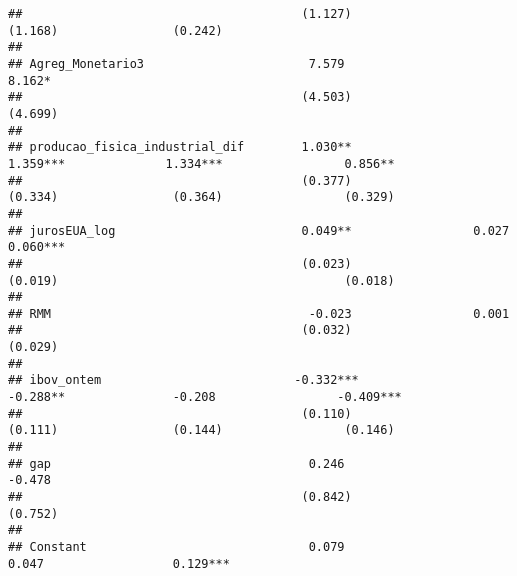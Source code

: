 \documentclass[
]{article}
\begin{document}
\begin{verbatim}
##                                       (1.127)                (1.168)                (0.242)                                  
##                                                                                                                              
## Agreg_Monetario3                       7.579                  8.162*                                                         
##                                       (4.503)                (4.699)                                                         
##                                                                                                                              
## producao_fisica_industrial_dif        1.030**                1.359***              1.334***                 0.856**          
##                                       (0.377)                (0.334)                (0.364)                 (0.329)          
##                                                                                                                              
## jurosEUA_log                          0.049**                 0.027                                         0.060***         
##                                       (0.023)                (0.019)                                        (0.018)          
##                                                                                                                              
## RMM                                    -0.023                 0.001                                                          
##                                       (0.032)                (0.029)                                                         
##                                                                                                                              
## ibov_ontem                           -0.332***               -0.288**               -0.208                 -0.409***         
##                                       (0.110)                (0.111)                (0.144)                 (0.146)          
##                                                                                                                              
## gap                                    0.246                  -0.478                                                         
##                                       (0.842)                (0.752)                                                         
##                                                                                                                              
## Constant                               0.079                                         0.047                  0.129***         

\end{verbatim}
\end{document}
